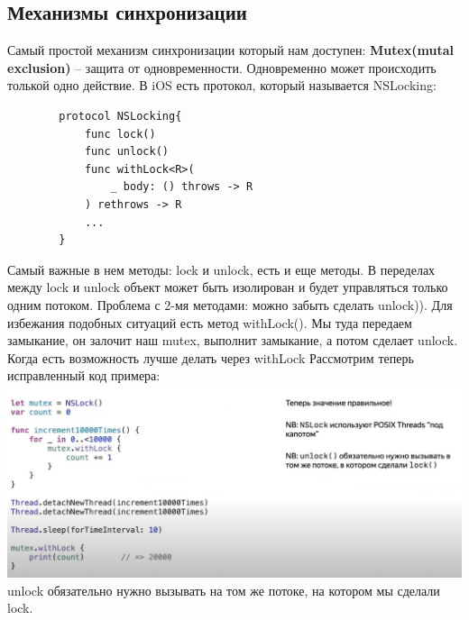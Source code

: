 \documentclass{article}
\begin{document}
    \subsection{Механизмы синхронизации}
    Самый простой механизм синхронизации который нам доступен: \textbf{Mutex(mutal exclusion)} -- защита от одновременности. Одновременно может происходить толькой одно действие. 
    \newline
    В iOS есть протокол, который называется NSLocking:
    \begin{verbatim}
        protocol NSLocking{
            func lock()
            func unlock()
            func withLock<R>(
                _ body: () throws -> R
            ) rethrows -> R
            ...
        }
    \end{verbatim}
    Самый важные в нем методы: lock и unlock, есть и еще методы. 
    \newline
    В переделах между lock и unlock объект может быть изолирован и будет управляться только одним потоком. 
    \newline
    Проблема с 2-мя методами: можно забыть сделать unlock)). Для избежания подобных ситуаций есть метод withLock(). Мы туда передаем замыкание, он залочит наш mutex, выполнит замыкание, а потом сделает unlock. Когда есть возможность лучше делать через withLock
    \newline
    Рассмотрим теперь исправленный код примера: 
    \newline
    \includegraphics[scale = 0.2]{pic/Снимок экрана 2023-08-04 в 12.14.15.png}
    \newline
    unlock обязательно нужно вызывать на том же потоке, на котором мы сделали lock.
\end{document}
